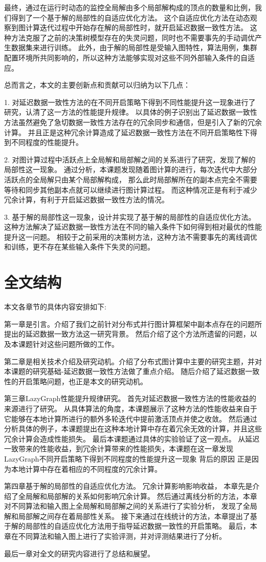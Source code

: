 最终，通过在运行时动态的监控全局解由多个局部解构成的顶点的数量和比例，我们得到了一个基于解的局部性的自适应优化方法。
这个自适应优化方法在动态观察到图计算迭代过程中开始存在解的局部性时，就开启延迟数据一致性方法。
这种方法克服了之前的决策树模型存在的失灵问题，同时也不需要事先的手动调优产生数据集来进行训练。
此外，由于解的局部性是受输入图特性，算法用例，集群配置环境所共同影响的，所以这种方法能够实现对这些不同外部输入条件的自适应。

总而言之，本文的主要创新点和贡献可以归纳为以下几点：

1. 对延迟数据一致性方法的在不同开启策略下得到不同性能提升这一现象进行了研究，认清了这一方法的性能提升规律。
以具体的例子识别出了延迟数据一致性方法虽然避免了急切数据一致性方法存在的冗余同步和通信，但是引入了新的冗余计算。
并且正是这种冗余计算造成了延迟数据一致性方法在不同开启策略性下得到不同程度的性能提升。

2. 对图计算过程中活跃点上全局解和局部解之间的关系进行了研究，发现了解的局部性这一现象。
通过分析，本课题发现随着图计算的进行，每次迭代中大部分活跃点的全局解只由某个局部解构成，
那么此时局部解所在的副本点完全不需要等待和同步其他副本点就可以继续进行图计算过程。
而这种情况正是有利于减少冗余计算，有利于开启延迟数据一致性方法的情况。

3. 基于解的局部性这一现象，设计并实现了基于解的局部性的自适应优化方法。
这种方法解决了延迟数据一致性方法在不同的输入条件下如何得到相对最优的性能提升这一问题。
相较于之前采用的决策树方法，这种方法不需要事先的离线调优和训练，更不存在某些输入条件下失灵的问题。




\section{全文结构}
本文各章节的具体内容安排如下:

第一章是引言。介绍了我们之前针对分布式并行图计算框架中副本点存在的问题所提出的延迟数据一致方法这一研究背景。
然后介绍了这个方法所遗留的问题，以及本课题针对这些问题所做的工作。

第二章是相关技术介绍及研究动机。介绍了分布式图计算中主要的研究主题，并对本课题的研究基础-延迟数据一致性方法做了重点介绍。
随后介绍了延迟数据一致性的开启策略问题，也正是本文的研究动机。

第三章LazyGraph性能提升规律研究。
首先对延迟数据一致性方法的性能收益的来源进行了研究。
从具体算法的角度，本课题展示了这种方法的性能收益来自于 它能够在本地计算所进行的额外多轮迭代中提前激活顶点并使之收敛。
然后通过分析具体的例子，本课题提出在这种本地计算中存在着冗余无效的计算，并且这些冗余计算会造成性能损失。
最后本课题通过具体的实验验证了这一观点。
从延迟一致带来的性能收益，到冗余计算带来的性能损失，本课题在这一章发现LazyGraph不同开启策略下得到不同程度的性能提升这一现象
背后的原因
正是因为本地计算中存在着相应的不同程度的冗余计算。

第四章基于解的局部性的自适应优化方法。
冗余计算影响影响收益，
本章先是介绍了全局解和局部解的关系如何影响冗余计算。
然后通过离线分析的方法，本章对不同算法和输入图上全局解和局部解之间的关系进行了实验分析，
发现了全局解和局部解之间存在着局部性关系。
接下来通过在线统计的方法，本章提出了基于解的局部性的自适应优化方法用于指导延迟数据一致性的开启策略。
最后，本章在不同算法和输入图上进行了实验评测，并对评测结果进行了分析。

最后一章对全文的研究内容进行了总结和展望。




